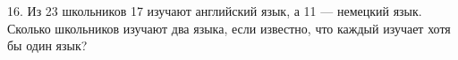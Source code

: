 16. Из 23 школьников 17 изучают английский язык, а 11 --- немецкий язык. Сколько школьников изучают два языка, если известно, что каждый изучает хотя бы один язык?\\
